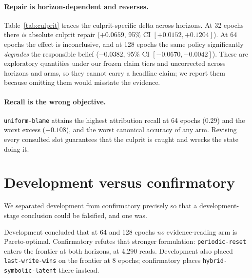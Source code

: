 \documentclass[11pt]{article}
\newcommand{\code}[1]{\texttt{\small #1}}
\begin{document}
\paragraph{Repair is horizon-dependent and reverses.}
Table~\ref{tab:culprit} traces the culprit-specific delta across horizons. At 32
epochs there \emph{is} absolute culprit repair ($+0.0659$, 95\% CI
$[+0.0152, +0.1204]$). At 64 epochs the effect is inconclusive, and at 128 epochs
the same policy significantly \emph{degrades} the responsible belief ($-0.0382$,
95\% CI $[-0.0670, -0.0042]$). These are exploratory quantities under our frozen
claim tiers and uncorrected across horizons and arms, so they cannot carry a
headline claim; we report them because omitting them would misstate the evidence.

\begin{table}[t]\centering\small

\caption{Culprit-specific accuracy delta for \code{counterfactual-recheck}.
Exploratory; uncorrected.}
\label{tab:culprit}
\end{table}

\paragraph{Recall is the wrong objective.} \code{uniform-blame} attains the
highest attribution recall at 64 epochs ($0.29$) and the worst excess
($-0.108$), and the worst canonical accuracy of any arm. Revising every consulted
slot guarantees that the culprit is caught and wrecks the state doing it.

\begin{table}[t]\centering\scriptsize

\caption{Delayed-credit policies at 64 epochs, means over 12 seeds.}
\label{tab:b001}
\end{table}

\section{Development versus confirmatory}
\label{sec:devconf}

We separated development from confirmatory precisely so that a development-stage
conclusion could be falsified, and one was.

Development concluded that at 64 and 128 epochs \emph{no} evidence-reading arm is
Pareto-optimal. Confirmatory refutes that stronger formulation:
\code{periodic-reset} enters the frontier at both horizons, at 4{,}290 reads.
Development also placed \code{last-write-wins} on the frontier at 8 epochs;
confirmatory places \code{hybrid-symbolic-latent} there instead.
\end{document}
